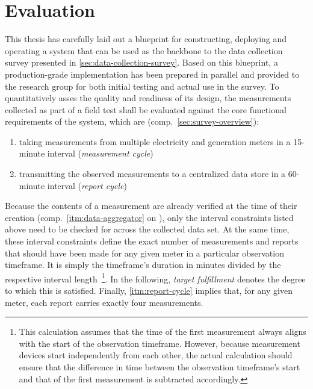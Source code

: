 
\chapter{Evaluation}
\label{chp:conclusion}

This thesis has carefully laid out a blueprint for constructing, deploying and operating a system that can be used as the backbone to the data collection survey presented in \autoref{sec:data-collection-survey}. Based on this blueprint, a production-grade implementation has been prepared in parallel and provided to the research group for both initial testing and actual use in the survey. To quantitatively asses the quality and readiness of its design, the measurements collected as part of a field test shall be evaluated against the core functional requirements of the system, which are (comp.~\autoref{sec:survey-overview}):

\begin{enumerate}[label=(\Alph*)]
  \item taking measurements from multiple electricity and generation meters in a 15-minute interval (\textit{measurement cycle}) \label{itm:measurement-cycle}
  \item transmitting the observed measurements to a centralized data store in a \mbox{60-minute} interval (\textit{report cycle}) \label{itm:report-cycle}
\end{enumerate}

Because the contents of a measurement are already verified at the time of their creation (comp.~\ref{itm:data-aggregator} on ), only the interval constraints listed above need to be checked for across the collected data set. At the same time, these interval constraints define the exact number of measurements and reports that should have been made for any given meter in a particular observation timeframe. It is simply the timeframe's duration in minutes divided by the respective interval length~\footnote{This calculation assumes that the time of the first measurement always aligns with the start of the observation timeframe. However, because measurement devices start independently from each other, the actual calculation should ensure that the difference in time between the observation timeframe's start and that of the first measurement is subtracted accordingly.}. In the following, \textit{target fulfillment} denotes the degree to which this is satisfied. Finally, \ref{itm:report-cycle} implies that, for any given meter, each report carries exactly four measurements. 

